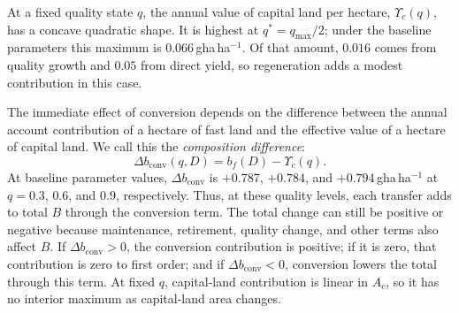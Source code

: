 \documentclass[preprint,12pt,authoryear]{elsarticle}
\newcommand{\dconv}{\Delta b_{\mathrm{conv}}}
\newcommand{\Ups}{\Upsilon_c}
\begin{document}
At a fixed quality state $q$, the annual value of capital land per hectare, $\Ups(q)$, has a concave quadratic shape. It is highest at $q^*=q_{\max}/2$; under the baseline parameters this maximum is $0.066$\,gha\,ha$^{-1}$. Of that amount, $0.016$ comes from quality growth and $0.05$ from direct yield, so regeneration adds a modest contribution in this case.

The immediate effect of conversion depends on the difference between the annual account contribution of a hectare of fast land and the effective value of a hectare of capital land. We call this the \emph{composition difference}:
\begin{equation}\label{eq:dconv}
\dconv(q,D)=b_f(D)-\Ups(q).
\end{equation}
At baseline parameter values, $\dconv$ is $+0.787$, $+0.784$, and $+0.794$\,gha\,ha$^{-1}$ at $q=0.3$, $0.6$, and $0.9$, respectively. Thus, at these quality levels, each transfer adds to total $B$ through the conversion term. The total change can still be positive or negative because maintenance, retirement, quality change, and other terms also affect $B$. If $\dconv>0$, the conversion contribution is positive; if it is zero, that contribution is zero to first order; and if $\dconv<0$, conversion lowers the total through this term. At fixed $q$, capital-land contribution is linear in $A_c$, so it has no interior maximum as capital-land area changes.
\end{document}
